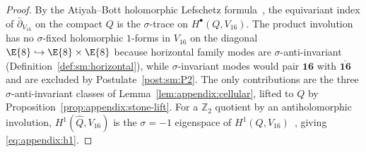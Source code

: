 \begin{proof}
By the Atiyah--Bott holomorphic Lefschetz formula~\cite{AtiyahBott1966}, the
equivariant index of $\bar\partial_{V_{16}}$ on the compact $Q$ is the
$\sigma$-trace on $H^\bullet(Q,V_{16})$. The product involution has no
$\sigma$-fixed holomorphic $1$-forms in $V_{16}$ on the diagonal
$\E{8}\hookrightarrow\E{8}\times\E{8}$ because horizontal family modes are
$\sigma$-anti-invariant (Definition~\ref{def:sm:horizontal}), while
$\sigma$-invariant modes would pair $\mathbf{16}$ with $\overline{\mathbf{16}}$
and are excluded by Postulate~\ref{post:sm:P2}. The only contributions are the
three $\sigma$-anti-invariant classes of
Lemma~\ref{lem:appendix:cellular}, lifted to $Q$ by
Proposition~\ref{prop:appendix:stone-lift}. For a $\mathbb{Z}_2$ quotient by an
antiholomorphic involution, $H^1(\hat Q,V_{16})$ is the $\sigma=-1$ eigenspace
of $H^1(Q,V_{16})$~\cite{AtiyahBott1966}, giving \eqref{eq:appendix:h1}.
\end{proof}